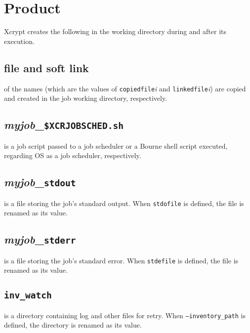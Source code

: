 \documentclass[a4paper,10pt]{report}
\begin{document}
\section{Product}\label{sec:created}

Xcrypt creates the following in the working directory
during and after its execution.


\subsection*{file and soft link}

of the names (which are the values of \texttt{copiedfile}\textit{i}
and \texttt{linkedfile}\textit{i}) are copied and created in the job
working directory, respectively.
\fi

\subsection*{\textit{myjob}\_\texttt{\$XCRJOBSCHED.sh}}

is a job script passed to a job scheduler or a Bourne shell script
executed, regarding OS as a job scheduler, respectively.

\subsection*{\textit{myjob}\_\texttt{stdout}}

is a file storing the job's standard output.  When \texttt{stdofile}
is defined, the file is renamed as its value.

\subsection*{\textit{myjob}\_\texttt{stderr}}

is a file storing the job's standard error.  When \texttt{stdefile}
is defined, the file is renamed as its value.

\subsection*{\texttt{inv\_watch}}

is a directory containing log and other files for retry.  When
\texttt{--inventory\_path} is defined, the directory is renamed as its
value.
\end{document}
